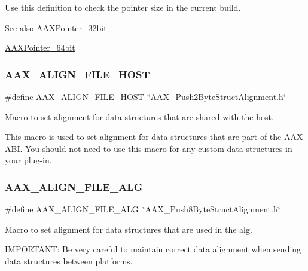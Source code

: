 Use this definition to check the pointer size in the current build. 

\begin{DoxySeeAlso}{See also}
\mbox{\hyperlink{a00392_a3310096b753437bda7ec67de445cf9cb}{A\+A\+X\+Pointer\+\_\+32bit}} 

\mbox{\hyperlink{a00392_a1a53e919284726babb582d3bb105b08b}{A\+A\+X\+Pointer\+\_\+64bit}} 
\end{DoxySeeAlso}
\mbox{\label{a00392_acbef7ed7d077bc9812cb56417e1ad325}} 
\subsubsection{\texorpdfstring{AAX\_ALIGN\_FILE\_HOST}{AAX\_ALIGN\_FILE\_HOST}}
{\footnotesize\ttfamily \#define A\+A\+X\+\_\+\+A\+L\+I\+G\+N\+\_\+\+F\+I\+L\+E\+\_\+\+H\+O\+ST~\char`\"{}A\+A\+X\+\_\+\+Push2\+Byte\+Struct\+Alignment.\+h\char`\"{}}



Macro to set alignment for data structures that are shared with the host. 

This macro is used to set alignment for data structures that are part of the A\+AX A\+BI. You should not need to use this macro for any custom data structures in your plug-\/in. \mbox{\label{a00392_a8fbeac3c5db5ac694e85a021ed74dc9e}} 
\subsubsection{\texorpdfstring{AAX\_ALIGN\_FILE\_ALG}{AAX\_ALIGN\_FILE\_ALG}}
{\footnotesize\ttfamily \#define A\+A\+X\+\_\+\+A\+L\+I\+G\+N\+\_\+\+F\+I\+L\+E\+\_\+\+A\+LG~\char`\"{}A\+A\+X\+\_\+\+Push8\+Byte\+Struct\+Alignment.\+h\char`\"{}}



Macro to set alignment for data structures that are used in the alg. 

I\+M\+P\+O\+R\+T\+A\+NT\+: Be very careful to maintain correct data alignment when sending data structures between platforms.

